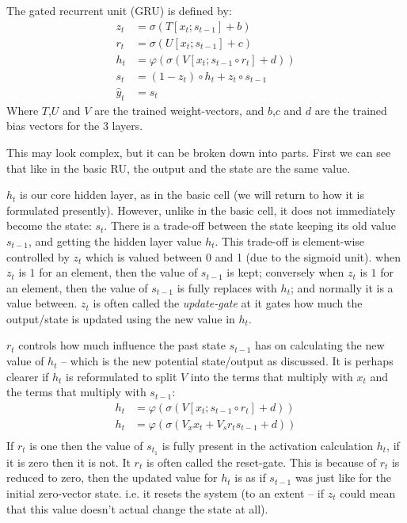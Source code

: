 \documentclass[12pt,parskip]{komatufte}
\begin{document}
The gated recurrent unit (GRU) is defined by:
\begin{align}
z_t &= \sigma \left( T[x_t; s_{t-1}] + b \right) \\
r_t &= \sigma \left( U[x_t; s_{t-1}] + c \right) \\
h_t &= \varphi \left( \sigma \left( V[x_t; s_{t-1} \circ r_t] + d \right) \right) \\
s_t &= (1-z_t) \circ h_t + z_t\circ s_{t-1}\\
\hat{y}_t &= s_t
\end{align}
Where $T$,$U$ and $V$ are the trained weight-vectors, and $b$,$c$ and $d$ are the trained bias vectors for the 3 layers.


This may look complex, but it can be broken down into parts.
First we can see that like in the basic RU, the output and the state are the same value.

$h_t$ is our core hidden layer, as in the basic cell (we will return to how it is formulated presently).
However, unlike in the basic cell, it does not immediately become the state: $s_t$.
There is a trade-off between the state keeping its old value $s_{t-1}$, and getting the hidden layer value $h_t$.
This trade-off is element-wise controlled by $z_t$ which is valued between 0 and 1 (due to the sigmoid unit).
when $z_t$ is $1$ for an element, then the value of $s_{t-1}$ is kept;
conversely when $z_t$ is $1$ for an element, then the value of $s_{t-1}$ is fully replaces with $h_t$;
and normally it is a value between.
$z_t$ is often called the \emph{update-gate} at it gates how much the output/state is updated using the new value in $h_t$.


$r_t$ controls how much influence the past state $s_{t-1}$ has on calculating the new value of $h_t$ -- which is the new potential state/output as discussed.
It is perhaps clearer if $h_t$ is reformulated to split $V$ into the terms that multiply with $x_t$ and the terms that multiply with $s_{t-1}$:
\begin{align}
h_t &= \varphi \left( \sigma \left( V[x_t; s_{t-1} \circ r_t] + d \right) \right) \\
h_t &= \varphi \left( \sigma \left( V_x x_t + V_s r_t s_{t-1} + d \right) \right) \\
\end{align}
If $r_t$ is one then the value of $s_{t_1}$ is fully present in the activation calculation $h_t$, if it is zero then it is not.
It $r_t$ is often called the reset-gate.
This is because of $r_t$ is reduced to zero, then the updated value for $h_t$ is as if $s_{t-1}$ was just like for the initial zero-vector state.
i.e. it resets the system (to an extent -- if $z_t$ could mean that this value doesn't actual change the state at all).
\end{document}
